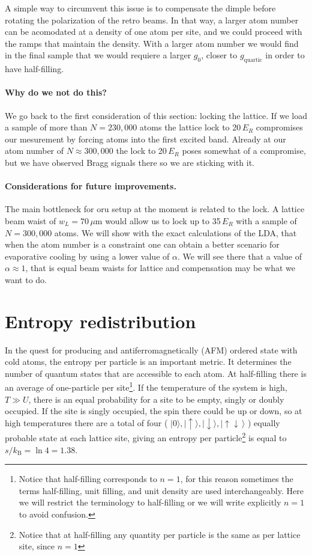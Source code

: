 \documentclass[11pt,letter]{article}
\newcommand{\kb}{\ensuremath{k_{\text{B}}}}
\newcommand{\dbl}{\ensuremath{ \uparrow\! \downarrow \, }}
\newcommand{\spup}{\ensuremath{ \uparrow }}
\newcommand{\spdn}{\ensuremath{ \downarrow}}
\begin{document}
A simple way to circumvent this issue is to compensate the dimple before
rotating the polarization of the retro beams.  In that way, a larger atom
number can be acomodated at a density of one atom per site, and we could
proceed with the ramps that maintain the density.  With a larger atom number
we would find in the final sample that we would requiere a larger $g_{0}$,
closer to $g_{\text{quartic}}$ in order to have half-filling.  

\paragraph{Why do we not do this?}  We go back to the first consideration of
this section:  locking the lattice.   If we load a sample of more than
$N=230,000$ atoms the lattice lock to 20\,$E_{R}$ compromises our mesurement
by forcing atoms into the first excited band.   Already at our atom number of
$N\approx 300,000$ the lock to 20\,$E_{R}$ poses somewhat of a compromise,
but we have observed Bragg signals there so we are sticking with it.  

\paragraph{Considerations for future improvements.}  The main bottleneck for
oru setup at the moment is related to the lock.  A lattice beam waist of
$w_{L}=70\,\mu$m  would allow us to lock up to 35\,$E_{R}$ with a sample of
$N=300,000$ atoms.   We will show with the exact calculations of the LDA,
that when the atom number is a constraint one can obtain a better scenario
for evaporative cooling by using a lower value of $\alpha$.  We will see
there that a value of $\alpha \approx 1$, that is equal beam waists for
lattice and compensation may be what we want to do.  

 

\section{ Entropy redistribution }

In the quest for producing and antiferromagnetically (AFM) ordered state with
cold atoms, the entropy per particle is an important metric.  It determines the
number of quantum states that are accessible to each atom.  At half-filling
there is an average of one-particle per site\footnote{Notice that half-filling
corresponds to $n=1$, for this reason sometimes the terms half-filling, unit
filling, and unit density are used interchangeably.  Here we will restrict the
terminology to half-filling or we will write explicitly $n=1$ to avoid
confusion.}.  If the temperature of the system is high, $T\gg U$,  there is an
equal probability for a site to be empty, singly or doubly occupied.  If  the
site is  singly occupied, the spin there could be up or down, so at high
temperatures there are a total of four ( $|0\rangle, |\spup\rangle,
|\spdn\rangle, |\dbl\rangle$ ) equally probable state at each lattice site,
giving an entropy per particle\footnote{Notice that at half-filling any
quantity per particle is the same as per lattice site, since $n=1$} is equal to
$s/\kb=\ln 4 = 1.38$.
\end{document}
